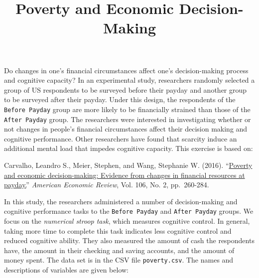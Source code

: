 \documentclass[]{article}
\title{Poverty and Economic Decision-Making}
\author{}
\date{}
\begin{document}
\maketitle


Do changes in one's financial circumstances affect one's decision-making
process and cognitive capacity? In an experimental study, researchers
randomly selected a group of US respondents to be surveyed before their
payday and another group to be surveyed after their payday. Under this
design, the respondents of the \texttt{Before Payday} group are more
likely to be financially strained than those of the
\texttt{After Payday} group. The researchers were interested in
investigating whether or not changes in people's financial circumstances
affect their decision making and cognitive performance. Other
researchers have found that scarcity induce an additional mental load
that impedes cognitive capacity. This exercise is based on:

Carvalho, Leandro S., Meier, Stephen, and Wang, Stephanie W. (2016).
``\href{http://dx.doi.org/10.1257/aer.20140481}{Poverty and economic
decision-making: Evidence from changes in financial resources at
payday.}'' \emph{American Economic Review}, Vol. 106, No. 2,
pp.~260-284.

In this study, the researchers administered a number of decision-making
and cognitive performance tasks to the \texttt{Before Payday} and
\texttt{After Payday} groups. We focus on the \emph{numerical stroop
task}, which measures cognitive control. In general, taking more time to
complete this task indicates less cognitive control and reduced
cognitive ability. They also measured the amount of cash the respondents
have, the amount in their checking and saving accounts, and the amount
of money spent. The data set is in the CSV file \texttt{poverty.csv}.
The names and descriptions of variables are given below:
\end{document}
